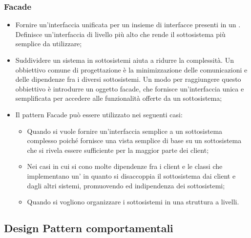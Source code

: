 \subsubsection{Facade}
\begin{itemize}
\item {} Fornire un'interfaccia unificata per un insieme di interfacce presenti in un . Definisce un'interfaccia di livello più alto che rende il sottosistema più semplice da utilizzare;
\item {} Suddividere un sistema in sottosistemi aiuta a ridurre la complessità. Un obbiettivo comune di progettazione è la minimizzazione delle comunicazioni e delle dipendenze fra i diversi sottosistemi. Un modo per raggiungere questo obbiettivo è introdurre un oggetto facade, che fornisce un'interfaccia unica e semplificata per accedere alle funzionalità offerte da un sottosistema;
\item {} Il pattern Facade può essere utilizzato nei seguenti casi:
\begin{itemize}
\item Quando si vuole fornire un'interfaccia semplice a un sottosistema complesso poiché fornisce una vista semplice di base su un sottosistema che si rivela essere sufficiente per la maggior parte dei client;
\item Nei casi in cui si cono molte dipendenze fra i client e le classi che implementano un' in quanto si disaccoppia il sottosistema dai client e dagli altri sistemi, promuovendo  ed indipendenza dei sottosistemi;
\item Quando si vogliono organizzare i sottosistemi in una struttura a livelli.
\end{itemize}
\end{itemize}

\subsection{Design Pattern comportamentali} %
